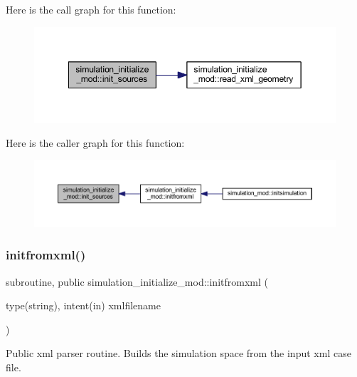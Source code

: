 Here is the call graph for this function\+:
\nopagebreak
\begin{figure}[H]
\begin{center}
\leavevmode
\includegraphics[width=349pt]{namespacesimulation__initialize__mod_ae89df4e3074d9624a7db2bc015545d8d_cgraph}
\end{center}
\end{figure}
Here is the caller graph for this function\+:
\nopagebreak
\begin{figure}[H]
\begin{center}
\leavevmode
\includegraphics[width=350pt]{namespacesimulation__initialize__mod_ae89df4e3074d9624a7db2bc015545d8d_icgraph}
\end{center}
\end{figure}
\mbox{\label{namespacesimulation__initialize__mod_aa596874d438807298121982eaa129d3a}} 
\subsubsection{\texorpdfstring{initfromxml()}{initfromxml()}}
{\footnotesize\ttfamily subroutine, public simulation\+\_\+initialize\+\_\+mod\+::initfromxml (\begin{DoxyParamCaption}\item[{type(string), intent(in)}]{xmlfilename }\end{DoxyParamCaption})}



Public xml parser routine. Builds the simulation space from the input xml case file. 


